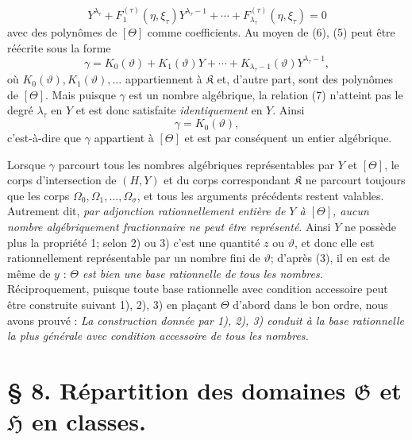 \begin{equation}
Y^{\lambda_\tau}+F_1^{(\tau)}(\eta,\xi_\tau)Y^{\lambda_\tau-1}
+\cdots+F_{\lambda_\tau}^{(\tau)}(\eta,\xi_\tau)=0
\tag{6}
\end{equation}
avec des polynômes de $[\Theta]$ comme coefficients. Au moyen de (6), (5) peut être réécrite sous la forme
\begin{equation}
\gamma=K_0(\vartheta)+K_1(\vartheta)Y+\cdots+
K_{\lambda_\tau-1}(\vartheta)Y^{\lambda_\tau-1},
\tag{7}
\end{equation}
où $K_0(\vartheta),K_1(\vartheta),\ldots$ appartiennent à $\mathfrak K$ et, d'autre part, sont des polynômes de $[\Theta]$. Mais puisque $\gamma$ est un nombre algébrique, la relation (7) n'atteint pas le degré $\lambda_\tau$ en $Y$ et est donc satisfaite \emph{identiquement} en $Y$. Ainsi
\[
 \gamma=K_0(\vartheta),
\]
c'est-à-dire que $\gamma$ appartient à $[\Theta]$ et est par conséquent un entier algébrique.

Lorsque $\gamma$ parcourt tous les nombres algébriques représentables par $Y$ et $[\Theta]$, le corps d'intersection de $(H,Y)$ et du corps correspondant $\mathfrak K$ ne parcourt toujours que les corps $\Omega_0,\Omega_1,\ldots,\Omega_\sigma$, et tous les arguments précédents restent valables. Autrement dit, \emph{par adjonction rationnellement entière de $Y$ à $[\Theta]$, aucun nombre algébriquement fractionnaire ne peut être représenté}. Ainsi $Y$ ne possède plus la propriété 1; selon 2) ou 3) c'est une quantité $z$ ou $\vartheta$, et donc elle est rationnellement représentable par un nombre fini de $\vartheta$; d'après (3), il en est de même de $y$ : \emph{$\Theta$ est bien une base rationnelle de tous les nombres.} Réciproquement, puisque toute base rationnelle avec condition accessoire peut être construite suivant 1), 2), 3) en plaçant $\Theta$ d'abord dans le bon ordre, nous avons prouvé : \emph{La construction donnée par 1), 2), 3) conduit à la base rationnelle la plus générale avec condition accessoire de tous les nombres.}

\section*{\S{} 8. Répartition des domaines $\mathfrak G$ et $\mathfrak H$ en classes.}

